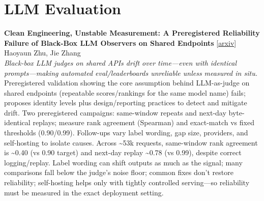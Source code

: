 \documentclass[12pt,letterpaper]{article}
\begin{document}
\medskip


\section*{LLM Evaluation}

{\small\textbf{Clean Engineering, Unstable Measurement: A Preregistered Reliability Failure of Black-Box LLM Observers on Shared Endpoints}} {\scriptsize[\href{https://arxiv.org/abs/2609.04198}{arxiv}]}\\
{\scriptsize Haoyaun Zhu, Jie Zhang}\\

{\small\textit{Black-box LLM judges on shared APIs drift over time---even with identical prompts---making automated eval/leaderboards unreliable unless measured in situ.}}\\[1pt]
{\footnotesize Preregistered validation showing the core assumption behind LLM-as-judge on shared endpoints (repeatable scores/rankings for the same model name) fails; proposes identity levels plus design/reporting practices to detect and mitigate drift. Two preregistered campaigns: same-window repeats and next-day byte-identical replays; measure rank agreement (Spearman) and exact-match vs fixed thresholds (0.90/0.99). Follow-ups vary label wording, gap size, providers, and self-hosting to isolate causes. Across \textasciitilde{}53k requests, same-window rank agreement is \textasciitilde{}0.40 (vs 0.90 target) and next-day replay \textasciitilde{}0.78 (vs 0.99), despite correct logging/replay. Label wording can shift outputs as much as the signal; many comparisons fall below the judge's noise floor; common fixes don't restore reliability; self-hosting helps only with tightly controlled serving---so reliability must be measured in the exact deployment setting.}

\medskip
\end{document}
